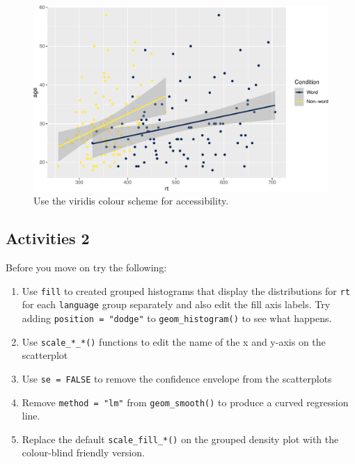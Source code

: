 \documentclass[
  english,
  doc,floatsintext]{apa6}
\begin{document}
\begin{figure}

{\centering \includegraphics[width=1\linewidth]{images/viridis-1} 

}

\caption{Use the viridis colour scheme for accessibility.}\label{fig:viridis}
\end{figure}

\hypertarget{activities-2}{%
\subsection{Activities 2}\label{activities-2}}

Before you move on try the following:

\begin{enumerate}
\def\labelenumi{\arabic{enumi}.}
\item
  Use \texttt{fill} to created grouped histograms that display the distributions for \texttt{rt} for each \texttt{language} group separately and also edit the fill axis labels. Try adding \texttt{position\ =\ "dodge"} to \texttt{geom\_histogram()} to see what happens.
\item
  Use \texttt{scale\_*\_*()} functions to edit the name of the x and y-axis on the scatterplot
\item
  Use \texttt{se\ =\ FALSE} to remove the confidence envelope from the scatterplots
\item
  Remove \texttt{method\ =\ "lm"} from \texttt{geom\_smooth()} to produce a curved regression line.
\item
  Replace the default \texttt{scale\_fill\_*()} on the grouped density plot with the colour-blind friendly version.
\end{enumerate}
\end{document}
